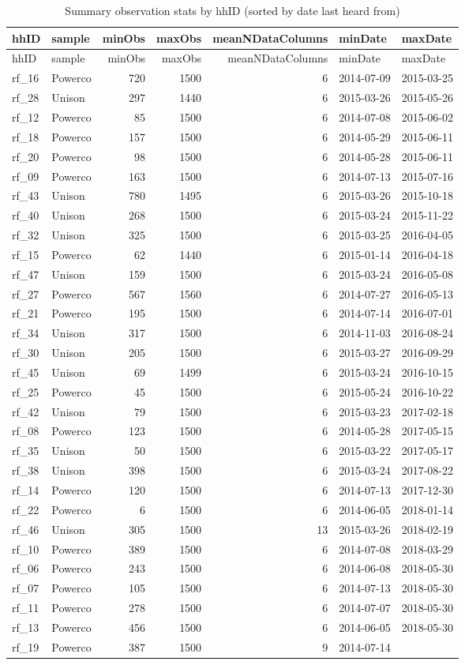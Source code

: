 \documentclass[]{article}
\begin{document}
\begin{longtable}[]{@{}llrrrll@{}}
\caption{Summary observation stats by hhID (sorted by date last heard
from)}\tabularnewline
\toprule
hhID & sample & minObs & maxObs & meanNDataColumns & minDate &
maxDate\tabularnewline
\midrule
\endfirsthead
\toprule
hhID & sample & minObs & maxObs & meanNDataColumns & minDate &
maxDate\tabularnewline
\midrule
\endhead
rf\_16 & Powerco & 720 & 1500 & 6 & 2014-07-09 &
2015-03-25\tabularnewline
rf\_28 & Unison & 297 & 1440 & 6 & 2015-03-26 &
2015-05-26\tabularnewline
rf\_12 & Powerco & 85 & 1500 & 6 & 2014-07-08 &
2015-06-02\tabularnewline
rf\_18 & Powerco & 157 & 1500 & 6 & 2014-05-29 &
2015-06-11\tabularnewline
rf\_20 & Powerco & 98 & 1500 & 6 & 2014-05-28 &
2015-06-11\tabularnewline
rf\_09 & Powerco & 163 & 1500 & 6 & 2014-07-13 &
2015-07-16\tabularnewline
rf\_43 & Unison & 780 & 1495 & 6 & 2015-03-26 &
2015-10-18\tabularnewline
rf\_40 & Unison & 268 & 1500 & 6 & 2015-03-24 &
2015-11-22\tabularnewline
rf\_32 & Unison & 325 & 1500 & 6 & 2015-03-25 &
2016-04-05\tabularnewline
rf\_15 & Powerco & 62 & 1440 & 6 & 2015-01-14 &
2016-04-18\tabularnewline
rf\_47 & Unison & 159 & 1500 & 6 & 2015-03-24 &
2016-05-08\tabularnewline
rf\_27 & Powerco & 567 & 1560 & 6 & 2014-07-27 &
2016-05-13\tabularnewline
rf\_21 & Powerco & 195 & 1500 & 6 & 2014-07-14 &
2016-07-01\tabularnewline
rf\_34 & Unison & 317 & 1500 & 6 & 2014-11-03 &
2016-08-24\tabularnewline
rf\_30 & Unison & 205 & 1500 & 6 & 2015-03-27 &
2016-09-29\tabularnewline
rf\_45 & Unison & 69 & 1499 & 6 & 2015-03-24 & 2016-10-15\tabularnewline
rf\_25 & Powerco & 45 & 1500 & 6 & 2015-05-24 &
2016-10-22\tabularnewline
rf\_42 & Unison & 79 & 1500 & 6 & 2015-03-23 & 2017-02-18\tabularnewline
rf\_08 & Powerco & 123 & 1500 & 6 & 2014-05-28 &
2017-05-15\tabularnewline
rf\_35 & Unison & 50 & 1500 & 6 & 2015-03-22 & 2017-05-17\tabularnewline
rf\_38 & Unison & 398 & 1500 & 6 & 2015-03-24 &
2017-08-22\tabularnewline
rf\_14 & Powerco & 120 & 1500 & 6 & 2014-07-13 &
2017-12-30\tabularnewline
rf\_22 & Powerco & 6 & 1500 & 6 & 2014-06-05 & 2018-01-14\tabularnewline
rf\_46 & Unison & 305 & 1500 & 13 & 2015-03-26 &
2018-02-19\tabularnewline
rf\_10 & Powerco & 389 & 1500 & 6 & 2014-07-08 &
2018-03-29\tabularnewline
rf\_06 & Powerco & 243 & 1500 & 6 & 2014-06-08 &
2018-05-30\tabularnewline
rf\_07 & Powerco & 105 & 1500 & 6 & 2014-07-13 &
2018-05-30\tabularnewline
rf\_11 & Powerco & 278 & 1500 & 6 & 2014-07-07 &
2018-05-30\tabularnewline
rf\_13 & Powerco & 456 & 1500 & 6 & 2014-06-05 &
2018-05-30\tabularnewline
rf\_19 & Powerco & 387 & 1500 & 9 & 2014-07-14 &

\end{longtable}
\end{document}
